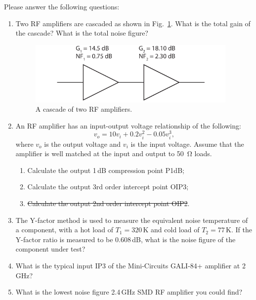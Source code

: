 \documentclass[letterpaper, 11pt]{article}
\begin{document}
\reversemarginpar
{}  Please answer the following questions:
\begin{enumerate}[itemsep=0.1ex, label=\alph*)]
		
	\item Two RF amplifiers are cascaded as shown in Fig.~\ref{fig:cascade}. What is the total gain of the cascade? What is the total noise figure? 
	\begin{figure}[h]
		\centering
		\includegraphics[width=4in]{cascade}
		\caption{A cascade of two RF amplifiers.}
		\label{fig:cascade}
	\end{figure}
		
	\item An RF amplifier has an input-output voltage relationship of the following:
		\[
			v_o = 10 v_i + 0.2 v_i^2 - 0.05 v_i^3,
		\]
		where $v_o$ is the output voltage and $v_i$ is the input voltage. Assume that the amplifier is well matched at the input and output to \SI{50}{\ohm} loads. 
		
		\begin{enumerate}[label=\roman*)]
			\item Calculate the output 1\,dB compression point P1dB;
			\item Calculate the output 3rd order intercept point OIP3;
			\item \st{Calculate the output 2nd order intercept point OIP2}.
		\end{enumerate}

	\item The Y-factor method is used to measure the equivalent noise temperature of a component, with a hot load of $T_1 = 320$\,K and cold load of $T_2 = 77$\,K. If the Y-factor ratio is measured to be 0.608\,dB, what is the noise figure of the component under test?
	
	\item What is the typical input IP3 of the Mini-Circuits GALI-84+ amplifier at 2\,GHz?
	
	\item What is the lowest noise figure 2.4\,GHz SMD RF amplifier you could find? 

\end{enumerate}
\end{document}
